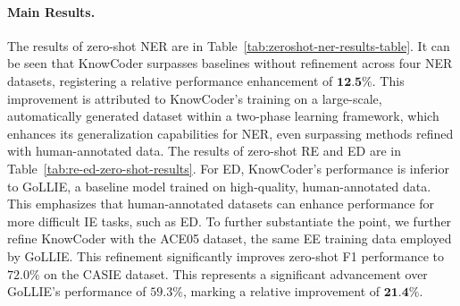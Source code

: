 \paragraph{Main Results.}
The results of zero-shot NER are in Table~\ref{tab:zeroshot-ner-results-table}.  It can be seen that KnowCoder surpasses baselines without refinement across four NER datasets, registering a relative performance enhancement of $\textbf{12.5\%}$. This improvement is attributed to KnowCoder's training on a large-scale, automatically generated dataset within a two-phase learning framework, which enhances its generalization capabilities for NER, even surpassing methods refined with human-annotated data. The results of zero-shot RE and ED are in Table~\ref{tab:re-ed-zero-shot-results}. For ED, KnowCoder's performance is inferior to GoLLIE, a baseline model trained on high-quality, human-annotated data. This emphasizes that human-annotated datasets can enhance performance for more difficult IE tasks, such as ED. To further substantiate the point, we further refine KnowCoder with the ACE05 dataset, the same EE training data employed by GoLLIE. This refinement significantly improves zero-shot F1 performance to $72.0\%$ on the CASIE dataset. This represents a significant advancement over GoLLIE's performance of $59.3\%$, marking a relative improvement of $\textbf{21.4\%}$.

